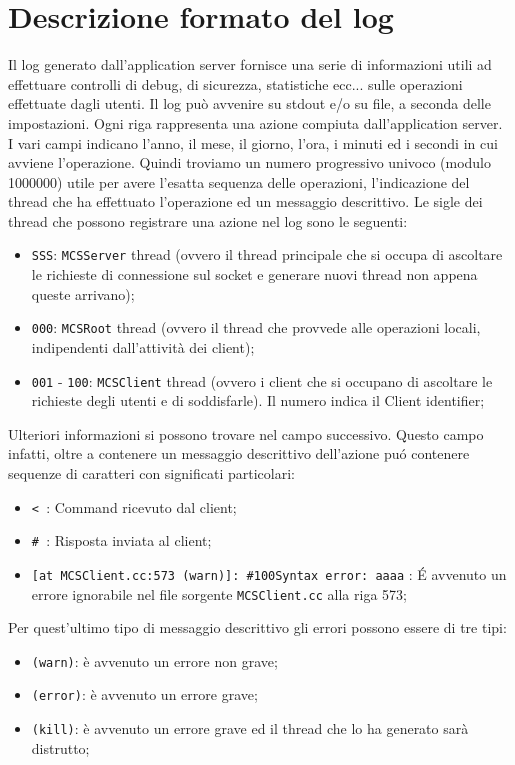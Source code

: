 \section{Descrizione formato del log}
Il log generato dall'application server fornisce una serie di
informazioni utili ad effettuare controlli di debug, di sicurezza,
statistiche ecc... sulle operazioni effettuate dagli utenti. Il log
pu\`o avvenire su stdout e/o su file, a seconda delle
impostazioni. Ogni riga rappresenta una azione compiuta
dall'application server. I vari campi indicano l'anno, il mese, il
giorno, l'ora, i minuti ed i secondi in cui avviene
l'operazione. Quindi troviamo un numero progressivo univoco (modulo
1000000) utile per avere l'esatta sequenza delle operazioni,
l'indicazione del thread che ha effettuato l'operazione ed un
messaggio descrittivo. Le sigle dei thread che possono registrare una
azione nel log sono le seguenti:
\begin{itemize}
\item \verb|SSS|: \verb|MCSServer| thread (ovvero il thread principale
  che si occupa di ascoltare le richieste di connessione sul socket e
  generare nuovi thread non appena queste arrivano);
\item \verb|000|: \verb|MCSRoot| thread (ovvero il thread che provvede
  alle operazioni locali, indipendenti dall'attivit\`a dei client);
\item \verb|001| - \verb|100|: \verb|MCSClient| thread (ovvero i
  client che si occupano di ascoltare le richieste degli utenti e di
  soddisfarle). Il numero indica il Client identifier;
\end{itemize}

Ulteriori informazioni si possono trovare nel campo successivo. Questo
campo infatti, oltre a contenere un messaggio descrittivo dell'azione
pu\'o contenere sequenze di caratteri con significati particolari:
\begin{itemize}
\item \verb|< |: Command ricevuto dal client;
\item \verb|# |: Risposta inviata al client;
\item \verb|[at MCSClient.cc:573 (warn)]: #100Syntax error: aaaa| : \'E
  avvenuto un errore ignorabile nel file sorgente \verb|MCSClient.cc| alla
  riga 573;
\end{itemize}

Per quest'ultimo tipo di messaggio descrittivo gli errori possono
essere di tre tipi:
\begin{itemize}
\item \verb|(warn)|: \`e avvenuto un errore non grave;
\item \verb|(error)|: \`e avvenuto un errore grave;
\item \verb|(kill)|: \`e avvenuto un errore grave ed il thread che lo
  ha generato sar\`a distrutto;
\end{itemize}


